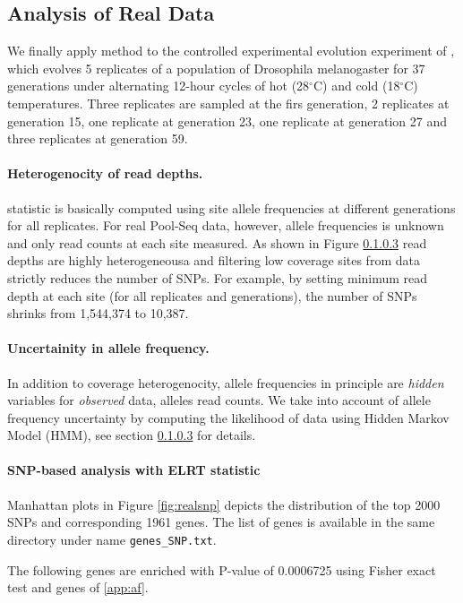 \documentclass[11pt]{article}
\def\comale{\text{COMALE }}
\begin{document}
\subsection{Analysis of Real Data}
We finally apply \comale method to the controlled experimental evolution 
experiment 
of \cite{orozco2012adaptation}, which evolves 5 replicates of a population of 
Drosophila melanogaster for 37 generations under alternating 12-hour cycles of 
hot (28$^{\circ}$C) and cold (18$^{\circ}$C) temperatures. Three replicates are 
sampled at the firs generation, 2 replicates at generation 15, one replicate at 
generation 23, one replicate at generation 27 and three replicates at 
generation 59.
\paragraph{Heterogenocity of read depths.} \comale statistic is basically 
computed using site allele frequencies at different generations for all 
replicates. For real Pool-Seq data, however, allele frequencies is unknown and 
only read counts at each site measured. As shown in Figure \ref{} read depths 
are highly heterogeneousa and filtering low coverage sites from data strictly 
reduces the number of SNPs. For example, by setting minimum read depth at 
each site (for all replicates and generations), the number of SNPs shrinks from 
1,544,374 to 10,387. 

\paragraph{Uncertainity in allele frequency.} In addition to coverage 
heterogenocity, 
allele frequencies in principle are 
\emph{hidden} variables for \emph{observed} data, alleles read counts. We 
take into account of allele frequency uncertainty by computing the likelihood 
of data using Hidden Markov Model (HMM), see section \ref{} for details.

\paragraph{SNP-based analysis with ELRT statistic}
Manhattan plots in Figure \ref{fig:realsnp} depicts the distribution of the top 2000 SNPs and corresponding 1961 genes. The list of genes is available in the same directory under name \texttt{genes\_SNP.txt}.

The following genes are enriched with P-value of 0.0006725 using Fisher exact test and genes of \ref{app:af}.
\end{document}
